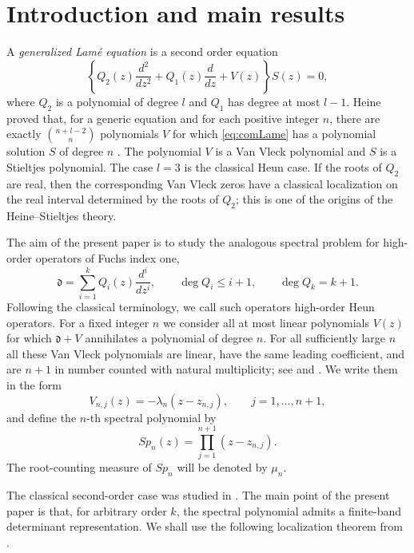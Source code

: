 \documentclass[10pt,twoside,a4paper,reqno]{amsart}
\theoremstyle{plain}
\theoremstyle{definition}
\theoremstyle{remark}
\newcommand {\dq}{\mathfrak d}
\begin{document}
\maketitle


\section{Introduction and main results}
\label{sec:intro}

A \emph{generalized Lam\'e equation} \cite{WW} is a second order equation
\begin{equation}\label{eq:comLame}
        \left\{Q_2(z)\frac{d^2}{dz^2}+Q_1(z)\frac{d}{dz}+V(z)\right\}S(z)=0,
\end{equation}
where $Q_2$ is a polynomial of degree $l$ and $Q_1$ has degree at most
$l-1$.  Heine proved that, for a generic equation and for each positive
integer $n$, there are exactly $\binom{n+l-2}{n}$ polynomials $V$ for which
\eqref{eq:comLame} has a polynomial solution $S$ of degree $n$ \cite{He}.
The polynomial $V$ is a Van Vleck polynomial and $S$ is a Stieltjes polynomial.
The case $l=3$ is the classical Heun case.  If the roots of $Q_2$ are real,
then the corresponding Van Vleck zeros have a classical localization on the
real interval determined by the roots of $Q_2$; this is one of the origins of
the Heine--Stieltjes theory.

The aim of the present paper is to study the analogous spectral problem for
high-order operators of Fuchs index one,
\begin{equation}\label{eq:1}
        \dq=\sum_{i=1}^k Q_i(z)\frac{d^i}{dz^i},
        \qquad \deg Q_i\le i+1,
        \qquad \deg Q_k=k+1 .
\end{equation}
Following the classical terminology, we call such operators high-order Heun
operators.  For a fixed integer $n$ we consider all at most linear polynomials
$V(z)$ for which $\dq+V$ annihilates a polynomial of degree $n$.  For all
sufficiently large $n$ all these Van Vleck polynomials are linear, have the same
leading coefficient, and are $n+1$ in number counted with natural multiplicity;
see \cite{Sh} and \cite{BoSh}.  We write them in the form
\[
        V_{n,j}(z)=-\lambda_n(z-z_{n,j}),\qquad j=1,\ldots,n+1,
\]
and define the $n$-th spectral polynomial by
\[
        Sp_n(z)=\prod_{j=1}^{n+1}(z-z_{n,j}).
\]
The root-counting measure of $Sp_n$ will be denoted by $\mu_n$.

The classical second-order case was studied in \cite{ShT,STT}.  The main point
of the present paper is that, for arbitrary order $k$, the spectral polynomial
admits a finite-band determinant representation.  %
 We shall use the following localization theorem from \cite{Sh,ShBook}.
\end{document}
